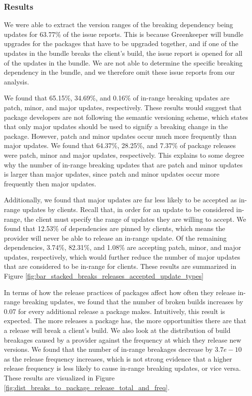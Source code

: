 \subsubsection{Results}
We were able to extract the version ranges of the breaking dependency being updates for 63.77\% of the issue reports. This is because Greenkeeper will bundle upgrades for the packages that have to be upgraded together, and if one of the updates in the bundle breaks the client's build, the issue report is opened for all of the updates in the bundle. We are not able to determine the specific breaking dependency in the bundle, and we therefore omit these issue reports from our analysis.
\par
We found that 65.15\%, 34.69\%, and 0.16\% of in-range breaking updates are patch, minor, and major updates, respectively. These results would suggest that package developers are not following the semantic versioning scheme, which states that only major updates should be used to signify a breaking change in the package. However, patch and minor updates occur much more frequently than major updates. We found that 64.37\%, 28.25\%, and 7.37\% of package releases were patch, minor and major updates, respectively. This explains to some degree why the number of in-range breaking updates that are patch and minor updates is larger than major updates, since patch and minor updates occur more frequently then major updates.
\par
Additionally, we found that major updates are far less likely to be accepted as in-range updates by clients. Recall that, in order for an update to be considered in-range, the client must specify the range of updates they are willing to accept. We found that 12.53\% of dependencies are pinned by clients, which means the provider will never be able to release an in-range update. Of the remaining dependencies, 3.74\%, 82.31\%, and 1.08\% are accepting patch, minor, and major updates, respectively, which would further reduce the number of major updates that are considered to be in-range for clients. These results are summarized in Figure \ref{fig:bar_stacked_breaks_releases_accepted_update_types}

\par
In terms of how the release practices of packages affect how often they release in-range breaking updates, we found that the number of broken builds increases by 0.07 for every additional release a package makes. Intuitively, this result is expected. The more releases a package has, the more opportunities there are that a release will break a client's build. We also look at the distribution of build breakages caused by a provider against the frequency at which they release new versions. We found that the number of in-range breakages decrease by $3.7e-10$ as the release frequency increases, which is not strong evidence that a higher release frequency is less likely to cause in-range breaking updates, or vice versa. These results are visualized in Figure \ref{fig:dist_breaks_to_package_release_total_and_freq}.
